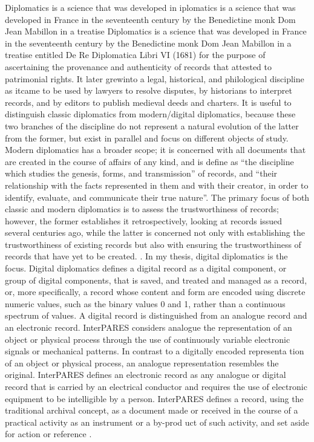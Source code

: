 Diplomatics is a science that was developed in iplomatics is a science that was developed in France in the seventeenth century by the Benedictine
monk Dom Jean Mabillon in a treatise Diplomatics is a science that was developed in France in the seventeenth century by the Benedictine monk Dom Jean Mabillon in a treatise entitled De Re Diplomatica Libri VI (1681) for the purpose of ascertaining the provenance and authenticity of records
that attested to patrimonial rights. It later grewinto a legal, historical, and philological discipline as itcame to be used by lawyers to resolve disputes, by historians to interpret records, and by editors to publish medieval deeds and charters. It is useful to distinguish classic diplomatics from modern/digital diplomatics, because these two branches of the discipline do not represent a natural evolution of the latter from the former, but exist in parallel and focus on different objects of study. Modern diplomatics has a broader scope; it is concerned with all documents that are created in the course of affairs of any kind, and is define as “the discipline which studies the genesis, forms, and transmission” of records, and “their relationship with the facts represented in them and with their creator, in order to identify, evaluate, and communicate their true nature”. The primary focus of both classic and modern diplomatics is to assess the trustworthiness of records; however, the former establishes it retrospectively, looking at records issued several centuries ago, while the latter is concerned not only with establishing the trustworthiness of existing records but also with ensuring the trustworthiness of records that have yet to be created. \cite[10]{kirschenbaum2010digital}. 
In my thesis, digital diplomatics is the focus.
Digital diplomatics defines a digital record as a digital component, or group of digital components, that is saved, and treated and managed as a record, or, more specifically, a record whose content and form are encoded using discrete numeric values, such as the binary values 0 and 1, rather than a continuous spectrum of values. A digital record is distinguished from an analogue record and an electronic record. InterPARES considers analogue the representation of an object or physical process through the use of continuously variable electronic signals or mechanical patterns. In contrast to a digitally encoded representa tion of an object or physical process, an analogue representation resembles the original. InterPARES defines an electronic record as any analogue or digital record that is carried by an electrical conductor and requires the use of electronic equipment to be intelligible by a person. InterPARES defines a record, using the traditional archival concept, as a document made or received in the course of a practical activity as an instrument or a by-prod uct of such activity, and set aside for action or reference \cite[52]{duranti2009digital}.

